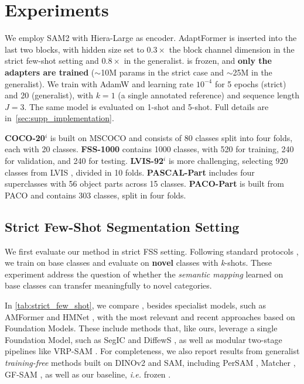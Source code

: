 \section{Experiments}
\label{sec:experiments}

We employ SAM2 with Hiera-Large \cite{ryali2023hiera} as encoder. AdaptFormer \cite{chen2022adaptformer} is inserted into the last two blocks, with hidden size set to $0.3\times$ the block channel dimension in the strict few-shot setting and $0.8\times$ in the generalist. \sam{} is frozen, and \textbf{only the adapters are trained} ($\sim$10M params in the strict case and $\sim$25M in the generalist). We train with AdamW and learning rate $10^{-4}$ for 5 epochs (strict) and 20 (generalist), with $k{=}1$ (a single annotated reference) and sequence length $J{=}3$. The same model is evaluated on 1-shot and 5-shot. Full details are in~\cref{sec:supp_implementation}.






\textbf{COCO-20$^i$} \cite{nguyen2019feature} is built on MSCOCO \cite{lin2014microsoft} and consists of 80 classes split into four folds, each with 20 classes. 
\textbf{FSS-1000} \cite{gao2022mutually} contains 1000 classes, with 520 for training, 240 for validation, and 240 for testing.
\textbf{LVIS-92$^i$} \cite{liu2023matcher} is more challenging, selecting 920 classes from LVIS \cite{gupta2019lvis}, divided in 10 folds. 
\textbf{PASCAL-Part} \cite{liu2023matcher} includes four superclasses with 56 object parts across 15 classes.
\textbf{PACO-Part} is built from PACO \cite{ramanathan2023paco} and contains 303 classes, split in four folds. 

\subsection{Strict Few-Shot Segmentation Setting}

We first evaluate our method in strict FSS setting. Following standard protocols \cite{wang2023amf, sun2024vrp, shi2022dense}, we train on base classes and evaluate on \textbf{novel} classes with \textit{k}-shots. These experiment address the question of whether the \textit{semantic mapping} learned on base classes can transfer meaningfully to novel categories. 




In \cref{tab:strict_few_shot}, we compare \ours{}, besides specialist models, such as AMFormer \cite{wang2023amf} and HMNet \cite{xu2025hybrid}, with the most relevant and recent approaches based on Foundation Models. These include methods that, like ours, leverage a single Foundation Model, such as SegIC \cite{meng2024segic} and DiffewS \cite{zhu2024unleashing}, as well as modular two-stage pipelines like VRP-SAM \cite{sun2024vrp}. For completeness, we also report results from generalist \textit{training-free} methods built on DINOv2 and SAM, including PerSAM \cite{zhang2023personalize}, Matcher \cite{liu2023matcher}, GF-SAM \cite{zhang2024bridge}, as well as our baseline, \textit{i.e.} frozen \sam{}.



